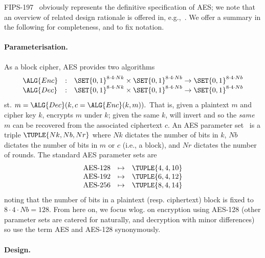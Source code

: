 
FIPS-197~\cite{FIPS:197} obviously represents the definitive specification
of AES; we note that an overview of related design rationale is offered in,
e.g.,~\cite{DaeRij:02}.  We offer a summary in the following \SEC[s] for
completeness, and to fix notation.

\paragraph{Parameterisation.}

As a block cipher, AES provides two algorithms
\[
\begin{array}{lcl}
\ALG{Enc} &:& \SET{ 0, 1 }^{8 \cdot 4 \cdot Nk} \times \SET{ 0, 1 }^{8 \cdot 4 \cdot Nb} \rightarrow \SET{ 0, 1 }^{8 \cdot 4 \cdot Nb} \\
\ALG{Dec} &:& \SET{ 0, 1 }^{8 \cdot 4 \cdot Nk} \times \SET{ 0, 1 }^{8 \cdot 4 \cdot Nb} \rightarrow \SET{ 0, 1 }^{8 \cdot 4 \cdot Nb} \\
\end{array}
\]
st.
$
m = \ALG{Dec}( k, c = \ALG{Enc}( k, m ) ) .
$
That is, given a plaintext $m$ and cipher key $k$,  encrypts $m$ 
under $k$; given the same $k$,  will invert  and so the
{\em same} $m$ can be recovered from the associated ciphertext $c$.  
An AES parameter set~\cite[Figure 4]{FIPS:197}
is a triple
$
\TUPLE{ Nk, Nb, Nr }
$
where 
$Nk$ dictates the number of bits in $k$,
$Nb$ dictates the number of bits in $m$ or $c$ (i.e., a block),
and
$Nr$ dictates the number of rounds.  The standard AES parameter sets are
\[
\begin{array}{lcl}
\mbox{AES-128} &\mapsto& \TUPLE{ 4, 4, 10 } \\
\mbox{AES-192} &\mapsto& \TUPLE{ 6, 4, 12 } \\
\mbox{AES-256} &\mapsto& \TUPLE{ 8, 4, 14 } \\
\end{array}
\]
noting that the number of bits in a plaintext (resp. ciphertext) block is
fixed to 
$
8 \cdot 4 \cdot Nb = 128 .
$
From here on, we focus wlog. on encryption using AES-128 (other parameter 
sets are catered for naturally, and decryption with minor differences) so
use the term AES and AES-128 synonymously.

\paragraph{Design.}

